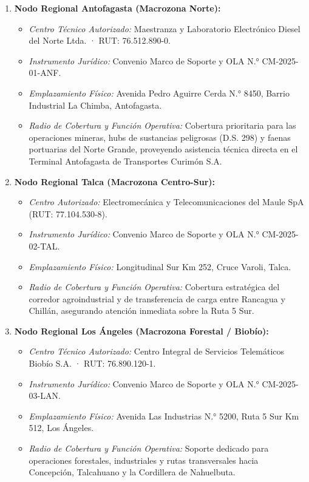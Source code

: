 \begin{enumerate}
  \item \textbf{Nodo Regional Antofagasta (Macrozona Norte):}
  \begin{itemize}
    \item \textit{Centro Técnico Autorizado:} Maestranza y Laboratorio Electrónico Diesel del Norte Ltda. · RUT: 76.512.890-0.
    \item \textit{Instrumento Jurídico:} Convenio Marco de Soporte y OLA N.° CM-2025-01-ANF.
    \item \textit{Emplazamiento Físico:} Avenida Pedro Aguirre Cerda N.° 8450, Barrio Industrial La Chimba, Antofagasta.
    \item \textit{Radio de Cobertura y Función Operativa:} Cobertura prioritaria para las operaciones mineras, hubs de sustancias peligrosas (D.S. 298) y faenas portuarias del Norte Grande, proveyendo asistencia técnica directa en el Terminal Antofagasta de Transportes Curimón S.A.
  \end{itemize}

  \item \textbf{Nodo Regional Talca (Macrozona Centro-Sur):}
  \begin{itemize}
    \item \textit{Centro Autorizado:} Electromecánica y Telecomunicaciones del Maule SpA (RUT: 77.104.530-8).
    \item \textit{Instrumento Jurídico:} Convenio Marco de Soporte y OLA N.° CM-2025-02-TAL.
    \item \textit{Emplazamiento Físico:} Longitudinal Sur Km 252, Cruce Varoli, Talca.
    \item \textit{Radio de Cobertura y Función Operativa:} Cobertura estratégica del corredor agroindustrial y de transferencia de carga entre Rancagua y Chillán, asegurando atención inmediata sobre la Ruta 5 Sur.
  \end{itemize}

  \item \textbf{Nodo Regional Los Ángeles (Macrozona Forestal / Biobío):}
  \begin{itemize}
    \item \textit{Centro Técnico Autorizado:} Centro Integral de Servicios Telemáticos Biobío S.A. · RUT: 76.890.120-1.
    \item \textit{Instrumento Jurídico:} Convenio Marco de Soporte y OLA N.° CM-2025-03-LAN.
    \item \textit{Emplazamiento Físico:} Avenida Las Industrias N.° 5200, Ruta 5 Sur Km 512, Los Ángeles.
    \item \textit{Radio de Cobertura y Función Operativa:} Soporte dedicado para operaciones forestales, industriales y rutas transversales hacia Concepción, Talcahuano y la Cordillera de Nahuelbuta.
  \end{itemize}


\end{enumerate}
